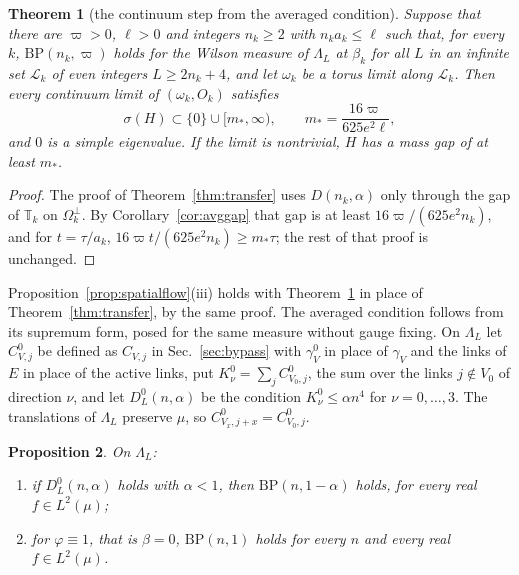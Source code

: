 \documentclass[aps,prd,twocolumn,superscriptaddress,nofootinbib,longbibliography,floatfix,amsmath,amssymb,10pt]{revtex4-2}
\newtheorem{theorem}{Theorem}
\newtheorem{proposition}[theorem]{Proposition}
\theoremstyle{definition}
\theoremstyle{remark}
\begin{document}
\begin{theorem}[the continuum step from the averaged condition]
\label{thm:avgtransfer}
Suppose that there are $\varpi>0$, $\ell>0$ and integers $n_k\ge2$ with
$n_ka_k\le\ell$ such that, for every $k$, $\mathrm{BP}(n_k,\varpi)$ holds for
the Wilson measure of $\Lambda_L$ at $\beta_k$ for all $L$ in an infinite
set $\mathcal L_k$ of even integers $L\ge2n_k+4$, and let $\omega_k$ be a
torus limit along $\mathcal L_k$. Then every continuum limit of
$(\omega_k,O_k)$ satisfies
\[
\sigma(H)\subset\{0\}\cup[m_*,\infty),\qquad m_*=\frac{16\varpi}{625e^2\ell},
\]
and $0$ is a simple eigenvalue. If the limit is nontrivial, $H$ has a mass
gap of at least $m_*$.
\end{theorem}

\begin{proof}
The proof of Theorem~\ref{thm:transfer} uses $D(n_k,\alpha)$ only through
the gap of $\mathbb T_k$ on $\Omega_k^\perp$. By Corollary~\ref{cor:avggap}
that gap is at least $16\varpi/(625e^2n_k)$, and for $t=\tau/a_k$,
$16\varpi t/(625e^2n_k)\ge m_*\tau$; the rest of that proof is unchanged.
\end{proof}

Proposition~\ref{prop:spatialflow}(iii) holds with
Theorem~\ref{thm:avgtransfer} in place of Theorem~\ref{thm:transfer}, by
the same proof. The averaged condition follows from its supremum form, posed
for the same measure without gauge fixing. On $\Lambda_L$ let
$C^0_{V,j}$ be defined as $C_{V,j}$ in Sec.~\ref{sec:bypass} with
$\gamma^0_V$ in place of $\gamma_V$ and the links of $E$ in place of the
active links, put $K^0_\nu=\sum_jC^0_{V_0,j}$, the sum over the links
$j\notin V_0$ of direction $\nu$, and let $D^0_L(n,\alpha)$ be the condition
$K^0_\nu\le\alpha n^4$ for $\nu=0,\dots,3$. The translations of
$\Lambda_L$ preserve $\mu$, so $C^0_{V_x,j+x}=C^0_{V_0,j}$.

\begin{proposition}\label{prop:avgsup}
On $\Lambda_L$:
\begin{enumerate}[label=\textup{(\roman*)},leftmargin=*]
\item if $D^0_L(n,\alpha)$ holds with $\alpha<1$, then
$\mathrm{BP}(n,1-\alpha)$ holds, for every real $f\in L^2(\mu)$;
\item for $\varphi\equiv1$, that is $\beta=0$, $\mathrm{BP}(n,1)$ holds for
every $n$ and every real $f\in L^2(\mu)$.
\end{enumerate}
\end{proposition}
\end{document}
